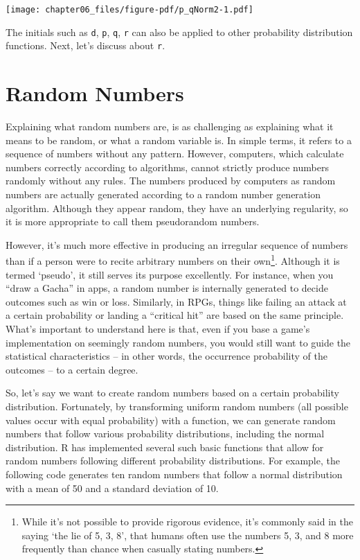 \documentclass[
  a4paper,
]{book}
\begin{document}
\texttt{[image: chapter06\_files/figure-pdf/p\_qNorm2-1.pdf]}

The initials such as \texttt{d}, \texttt{p}, \texttt{q}, \texttt{r} can
also be applied to other probability distribution functions. Next, let's
discuss about \texttt{r}.

\section{Random Numbers}\label{random-numbers}

Explaining what random numbers are, is as challenging as explaining what
it means to be random, or what a random variable is. In simple terms, it
refers to a sequence of numbers without any pattern. However, computers,
which calculate numbers correctly according to algorithms, cannot
strictly produce numbers randomly without any rules. The numbers
produced by computers as random numbers are actually generated according
to a random number generation algorithm. Although they appear random,
they have an underlying regularity, so it is more appropriate to call
them pseudorandom numbers.

However, it's much more effective in producing an irregular sequence of
numbers than if a person were to recite arbitrary numbers on their
own\footnote{While it's not possible to provide rigorous evidence, it's
  commonly said in the saying `the lie of 5, 3, 8', that humans often
  use the numbers 5, 3, and 8 more frequently than chance when casually
  stating numbers.}. Although it is termed `pseudo', it still serves its
purpose excellently. For instance, when you ``draw a Gacha'' in apps, a
random number is internally generated to decide outcomes such as win or
loss. Similarly, in RPGs, things like failing an attack at a certain
probability or landing a ``critical hit'' are based on the same
principle. What's important to understand here is that, even if you base
a game's implementation on seemingly random numbers, you would still
want to guide the statistical characteristics -- in other words, the
occurrence probability of the outcomes -- to a certain degree.

So, let's say we want to create random numbers based on a certain
probability distribution. Fortunately, by transforming uniform random
numbers (all possible values occur with equal probability) with a
function, we can generate random numbers that follow various probability
distributions, including the normal distribution. R has implemented
several such basic functions that allow for random numbers following
different probability distributions. For example, the following code
generates ten random numbers that follow a normal distribution with a
mean of 50 and a standard deviation of 10.
\end{document}
